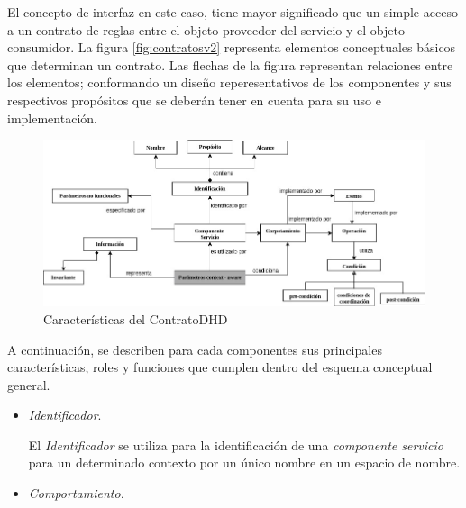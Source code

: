 {El concepto de interfaz en este caso, tiene mayor significado que un simple acceso a un contrato de reglas entre el objeto proveedor del servicio y el objeto consumidor. La figura \ref{fig:contratosv2} representa elementos conceptuales básicos que determinan un contrato. Las flechas de la figura representan relaciones entre los elementos; conformando un diseño reperesentativos de los componentes y sus respectivos propósitos que se deberán tener en cuenta para su uso e implementación. 

\begin{figure}
\begin{center}
 \includegraphics [width=6 in,totalheight=3 in]{Ch4/contrato_conceptual}
\end{center}
\caption{Características del ContratoDHD}
\label{fig:contratov2}
\end{figure}

A continuación, se describen para cada componentes sus principales características, roles y funciones que cumplen dentro 
del esquema conceptual general.


\begin{itemize}

\item \textit{Identificador}.

El \textit{Identificador} se utiliza para la identificación de una \textit{componente servicio} para un determinado contexto por un único nombre en un espacio de nombre.

\item \textit{Comportamiento.}


\end{itemize}}
